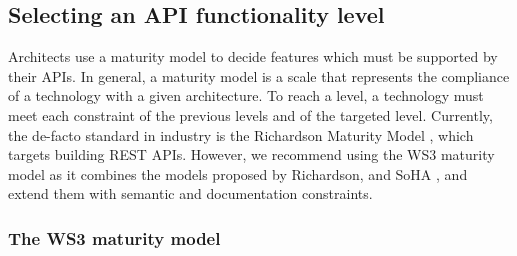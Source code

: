 



\subsection{Selecting an API functionality level}\label{sec:maturityLevel}

Architects use a maturity model to decide features which must be supported by their APIs. In general, a maturity model is a scale that represents the compliance of a technology with a given architecture. To reach a level, a technology must meet each constraint of the previous levels and of the targeted level.
Currently, the de-facto standard in industry is the Richardson Maturity Model \cite{RichardsonMaturityModel}, which targets building REST APIs. However, we recommend using the WS3 maturity model \cite{7195633} as it combines the models proposed by Richardson, and SoHA \cite{SoHA}, and extend them with semantic and documentation constraints.

\subsubsection{The WS3 maturity model}

